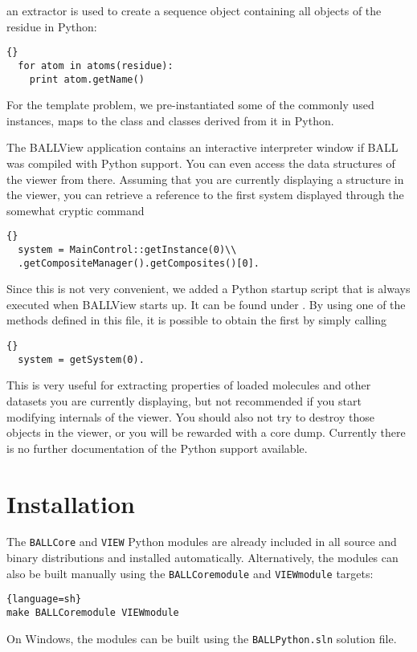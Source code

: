 \noindent
an  extractor is used to create a sequence object containing
all objects of the residue in Python:

\begin{lstlisting}{}
  for atom in atoms(residue):
    print atom.getName()
\end{lstlisting}

For the template problem, we pre-instantiated some of the 
commonly used instances, \eg {} maps to the 
 class and classes derived from it in Python.

The BALLView application contains an interactive interpreter window
if BALL was compiled with Python support. You can even access the
data structures of the viewer from there. Assuming that you are
currently displaying a structure in the viewer, you can retrieve a
reference to the first system displayed through the somewhat cryptic
command 

\begin{lstlisting}{}
  system = MainControl::getInstance(0)\\
  .getCompositeManager().getComposites()[0].
\end{lstlisting}

\noindent
Since this is not very convenient, we added a Python startup script that is 
always executed when \mbox{BALLView} starts up. It can be found under 
. By using one of the methods defined in this file,
it is possible to obtain the first  by simply calling

\begin{lstlisting}{}
  system = getSystem(0).
\end{lstlisting}

\noindent
This is very useful for extracting properties of loaded molecules and other 
datasets you are currently displaying, but not recommended if you start 
modifying internals of the viewer. You should also not try to destroy those 
objects in the viewer, or you will be rewarded with a core dump. Currently 
there is no further documentation of the Python support available.
		

\section{Installation}

The \texttt{BALLCore} and \texttt{VIEW} Python modules are already included
in all source and  binary distributions and installed automatically.
Alternatively, the modules can also be built manually using the
\texttt{BALLCoremodule} and \texttt{VIEWmodule} targets:
\begin{lstlisting}{language=sh}
make BALLCoremodule VIEWmodule
\end{lstlisting}
On Windows, the modules can be built using the \texttt{BALLPython.sln}
solution file.

